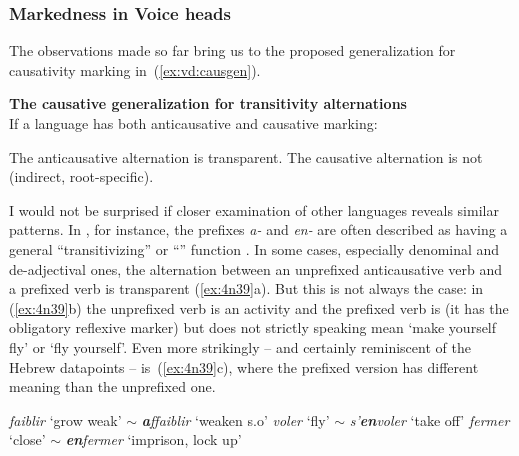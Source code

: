 \begin{exe}
\begin{xlist}
\begin{xlist}
\begin{exe}
\begin{exe}
\begin{xlist}
\begin{exe}
\begin{xlist}
\begin{exe}
\begin{xlist}
\begin{xlist}
\begin{exe}
\begin{xlist}
\begin{exe}
\begin{xlist}
\begin{exe}
\begin{exe}
\begin{exe}
\begin{xlist}
\begin{exe}
\begin{exe}
\begin{xlist}
\begin{xlist}
\begin{exe}
\begin{xlist}
\begin{exe}
\begin{exe}
\begin{exe}
\begin{xlist}
\begin{exe}
\begin{exe}
\begin{xlist}
\begin{exe}
\begin{xlist}
\begin{exe}
\begin{xlist}
\begin{exe}
\begin{xlist}
\begin{exe}
\begin{exe}
\begin{xlist}
\begin{exe}
\begin{exe}
\begin{xlist}
\begin{xlist}
\begin{exe}
\begin{xlist}
\begin{xlist}
\begin{exe}
\begin{xlist}
\begin{exe}
\begin{xlist}
			\subsubsection{Markedness in Voice heads} \label{vd:caus:markvoice}
The observations made so far bring us to the proposed generalization for causativity marking in~(\ref{ex:vd:causgen}).
 \begin{exe}
 \ex \label{ex:vd:causgen}\textbf{The causative generalization for transitivity alternations} \\
 	If a language has both anticausative and causative marking:
 \begin{xlist} 
 	\ex  The anticausative alternation is transparent. 
 	\ex  The causative alternation is not (indirect, root-specific). 
 \z
\z 

I would not be surprised if closer examination of other languages reveals similar patterns. In , for instance, the prefixes \emph{a-} and \emph{en-} are often described as having a general ``transitivizing'' or ``'' function \citep{junker87}. In some cases, especially denominal and de-adjectival ones, the  alternation between an unprefixed anticausative verb and a prefixed  verb is transparent (\ref{ex:4n39}a). But this is not always the case: in (\ref{ex:4n39}b) the unprefixed verb is an activity and the prefixed verb is  (it has the obligatory reflexive marker) but does not strictly speaking mean `make yourself fly' or `fly yourself'. Even more strikingly -- and certainly reminiscent of the Hebrew datapoints -- is~(\ref{ex:4n39}c), where the prefixed version has different meaning than the unprefixed one.
 \begin{exe}
\ex  {}\label{ex:4n39}
	\begin{xlist}
	\ex \emph{faiblir}	`grow weak' $\sim$ 	\emph{\textbf{a}ffaiblir} `weaken s.o'
	\ex \emph{voler} `fly' $\sim$ \emph{s'\textbf{en}voler} `take off'
	\ex \emph{fermer}	`close' $\sim$ \emph{\textbf{en}fermer} `imprison, lock up'

\end{xlist}
\end{exe}
\end{xlist}
\end{exe}
\end{xlist}
\end{exe}
\end{xlist}
\end{exe}
\end{xlist}
\end{xlist}
\end{exe}
\end{xlist}
\end{xlist}
\end{exe}
\end{exe}
\end{xlist}
\end{exe}
\end{exe}
\end{xlist}
\end{exe}
\end{xlist}
\end{exe}
\end{xlist}
\end{exe}
\end{xlist}
\end{exe}
\end{exe}
\end{xlist}
\end{exe}
\end{exe}
\end{exe}
\end{xlist}
\end{exe}
\end{xlist}
\end{xlist}
\end{exe}
\end{exe}
\end{xlist}
\end{exe}
\end{exe}
\end{exe}
\end{xlist}
\end{exe}
\end{xlist}
\end{exe}
\end{xlist}
\end{xlist}
\end{exe}
\end{xlist}
\end{exe}
\end{xlist}
\end{exe}
\end{exe}
\end{xlist}
\end{xlist}
\end{exe}
